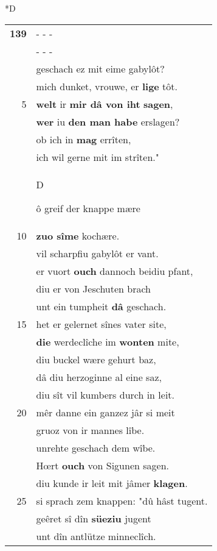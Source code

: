 \documentclass[8pt,a4paper,notitlepage]{article}
\begin{document}
\begin{table}[ht]
\begin{minipage}[t]{0.5\linewidth}
\small
\begin{center}*D
\end{center}
\begin{tabular}{rl}
\textbf{139} & \multicolumn{1}{l}{ - - - }\\ 
 & \multicolumn{1}{l}{ - - - }\\ 
 & geschach ez mit eime gabylôt?\\ 
 & mich dunket, vrouwe, er \textbf{lige} tôt.\\ 
5 & \textbf{welt} ir \textbf{mir dâ von iht} \textbf{sagen},\\ 
 & \textbf{wer} iu \textbf{den man habe} erslagen?\\ 
 & ob ich in \textbf{mag} errîten,\\ 
 & ich wil gerne mit im strîten."\\ 
 & \begin{large}D\end{large}ô greif der knappe mære\\ 
10 & \textbf{zuo sîme} kochære.\\ 
 & vil scharpfiu gabylôt er vant.\\ 
 & er vuort \textbf{ouch} dannoch beidiu pfant,\\ 
 & diu er von Jeschuten brach\\ 
 & unt ein tumpheit \textbf{dâ} geschach.\\ 
15 & het er gelernet sînes vater site,\\ 
 & \textbf{die} werdeclîche im \textbf{wonten} mite,\\ 
 & diu buckel wære gehurt baz,\\ 
 & dâ diu herzoginne al eine saz,\\ 
 & diu sît vil kumbers durch in leit.\\ 
20 & mêr danne ein ganzez jâr si meit\\ 
 & gruoz von ir mannes lîbe.\\ 
 & unrehte geschach dem wîbe.\\ 
 & Hœrt \textbf{ouch} von Sigunen sagen.\\ 
 & diu kunde ir leit mit jâmer \textbf{klagen}.\\ 
25 & si sprach zem knappen: "dû hâst tugent.\\ 
 & geêret sî dîn \textbf{süeziu} jugent\\ 
 & unt dîn antlütze minneclîch.\\ 

\end{tabular}
\end{minipage}
\end{table}
\end{document}
